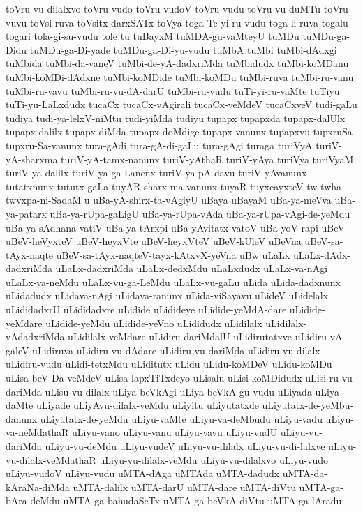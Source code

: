 {toVru-vu-dilalxvo
toVru-vudo
toVru-vudoV
toVru-vudu
toVru-vu-duMTu
toVru-vuvu
toVsi-ruva
toVsitx-darxSATx
toVya
toga-Te-yi-ru-vudu
toga-li-ruva
togalu
togari
tola-gi-su-vudu
tole
tu
tuBayxM
tuMDA-gu-vaMteyU
tuMDu
tuMDu-ga-Didu
tuMDu-ga-Di-yade
tuMDu-ga-Di-yu-vudu
tuMbA
tuMbi
tuMbi-dAdxgi
tuMbida
tuMbi-da-vaneV
tuMbi-de-yA-dadxriMda
tuMbidudx
tuMbi-koMDanu
tuMbi-koMDi-dAdxne
tuMbi-koMDide
tuMbi-koMDu
tuMbi-ruva
tuMbi-ru-vanu
tuMbi-ru-vavu
tuMbi-ru-vu-dA-darU
tuMbi-ru-vudu
tuTi-yi-ru-vaMte
tuTiyu
tuTi-yu-LaLxdudx
tucaCx
tucaCx-vAgirali
tucaCx-veMdeV
tucaCxveV
tudi-gaLu
tudiya
tudi-ya-lelxV-niMtu
tudi-yiMda
tudiyu
tupapx
tupapxda
tupapx-dalUlx
tupapx-dalilx
tupapx-diMda
tupapx-doMdige
tupapx-vanunx
tupapxvu
tupxruSa
tupxru-Sa-vanunx
tura-gAdi
tura-gA-di-gaLu
tura-gAgi
turaga
turiVyA
turiV-yA-sharxma
turiV-yA-tamx-nanunx
turiV-yAthaR
turiV-yAya
turiVya
turiVyaM
turiV-ya-dalilx
turiV-ya-ga-Lanenx
turiV-ya-pA-davu
turiV-yAvanunx
tutatxnunx
tututx-gaLa
tuyAR-sharx-ma-vanunx
tuyaR
tuyxcayxteV
tw
twha
twvxpa-ni-SadaM
u
uBa-yA-shirx-ta-vAgiyU
uBaya
uBayaM
uBa-ya-meVva
uBa-ya-patarx
uBa-ya-rUpa-gaLigU
uBa-ya-rUpa-vAda
uBa-ya-rUpa-vAgi-de-yeMdu
uBa-ya-sAdhana-vatiV
uBa-ya-tArxpi
uBa-yAvitatx-vatoV
uBa-yoV-rapi
uBeV
uBeV-heVyxteV
uBeV-heyxVte
uBeV-heyxVteV
uBeV-kUleV
uBeVna
uBeV-sa-tAyx-naqte
uBeV-sa-tAyx-naqteV-tayx-kAtxvX-yeVna
uBw
uLaLx
uLaLx-dAdx-dadxriMda
uLaLx-dadxriMda
uLaLx-dedxMdu
uLaLxdudx
uLaLx-va-nAgi
uLaLx-va-neMdu
uLaLx-vu-ga-LeMdu
uLaLx-vu-gaLu
uLida
uLida-dadxnunx
uLidadudx
uLidava-nAgi
uLidava-ranunx
uLida-viSayavu
uLideV
uLidelalx
uLididadxrU
uLididadxre
uLidide
uLidideye
uLidide-yeMdA-dare
uLidide-yeMdare
uLidide-yeMdu
uLidide-yeVno
uLididudx
uLidilalx
uLidilalx-vAdadxriMda
uLidilalx-veMdare
uLidiru-dariMdalU
uLidirutatxve
uLidiru-vA-galeV
uLidiruva
uLidiru-vu-dAdare
uLidiru-vu-dariMda
uLidiru-vu-dilalx
uLidiru-vudu
uLidi-tetxMdu
uLiditutx
uLidu
uLidu-koMDeV
uLidu-koMDu
uLisa-beV-Da-veMdeV
uLisa-lapxTiTxdeyo
uLisalu
uLisi-koMDidudx
uLisi-ru-vu-dariMda
uLisu-vu-dilalx
uLiya-beVkAgi
uLiya-beVkA-gu-vudu
uLiyada
uLiya-daMte
uLiyade
uLiyAvu-dilalx-veMdu
uLiyitu
uLiyutatxde
uLiyutatx-de-yeMbu-danunx
uLiyutatx-de-yeMdu
uLiyu-vaMte
uLiyu-va-deMbudu
uLiyu-vadu
uLiyu-va-neMdathaR
uLiyu-vano
uLiyu-vanu
uLiyu-vavu
uLiyu-vudU
uLiyu-vu-dariMda
uLiyu-vu-deMdu
uLiyu-vudeV
uLiyu-vu-dilalx
uLiyu-vu-di-lalxve
uLiyu-vu-dilalx-veMdathaR
uLiyu-vu-dilalx-veMdu
uLiyu-vu-dilalxvo
uLiyu-vudo
uLiyu-vudoV
uLiyu-vudu
uMTA-dAga
uMTAda
uMTA-dadudx
uMTA-da-kAraNa-diMda
uMTA-dalilx
uMTA-darU
uMTA-dare
uMTA-diVtu
uMTA-ga-bAra-deMdu
uMTA-ga-bahudaSeTx
uMTA-ga-beVkA-diVtu
uMTA-ga-lAradu
}
